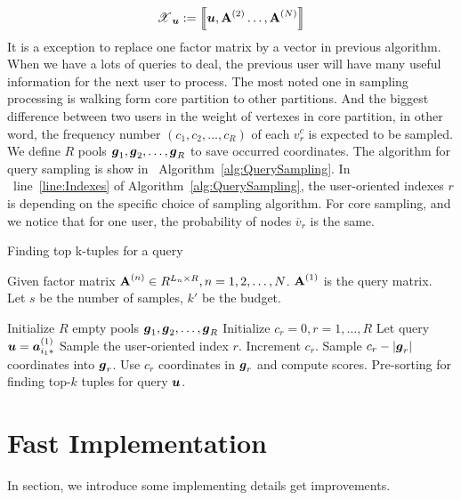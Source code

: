 \documentclass[letterpaper]{article}
\newcommand{\T}[1]{\boldsymbol{\mathscr{\MakeUppercase{#1}}}}
\newcommand{\KT}[1]{\left\llbracket #1 \right\rrbracket}
\newcommand{\V}[1]{{\bm{{\MakeLowercase{#1}}}}}
\newcommand{\VnC}[3]{\V{#1}^{(#2)}_{#3}}
\newcommand{\M}[1]{{\bm{\mathbf{\MakeUppercase{#1}}}}}
\newcommand{\Mn}[2]{\M{#1}^{(#2)}}
\newcommand{\Alg}[1] {Algorithm~\ref{alg:#1}}
\newcommand{\AlgLine}[2]{line~\ref{line:#2} of Algorithm~\ref{alg:#1}}
\begin{document}
\begin{equation}\label{eq:RankTensorCP}
\T{X}_{\V{u}} := \KT{ \V{u},\Mn{A}{2}\dots,\Mn{A}{N}}
\end{equation}
It is a exception to replace one factor matrix by a vector in previous algorithm.
When we have a lots of queries to deal,
the previous user will have many useful information for the next user to process.
The most noted one in sampling processing is walking form core partition to other partitions.
And the biggest difference between two users in the weight of vertexes in core partition,
in other word,
the frequency number $(c_1,c_2,\ldots,c_R)$ of each $v^c_r$ is expected to be sampled.
We define $R$ pools $\V{g}_1,\V{g}_2,\ldots,\V{g}_R$ to save occurred coordinates.
The algorithm for query sampling is show in ~\Alg{QuerySampling}.
In ~\AlgLine{QuerySampling}{Indexes},
the user-oriented indexes $r$ is depending on the specific choice of sampling algorithm.
For core sampling, and we notice that for one user,
the probability of nodes $\overline{v}_r$ is the same.

\begin{algorithm}[t]
    \caption{Finding top k-tuples for a query}\label{alg:QuerySampling}
        Given factor matrix $\M{A}^{(n)}\in R^{L_n\times R}, n = 1,2,\ldots,N$.
        $\M{A}^{(1)}$ is the query matrix.\\
        Let $s$ be the number of samples, $k'$ be the budget.
    \begin{algorithmic}[1]
    \State Initialize $R$ empty pools $\V{g}_1,\V{g}_2,\ldots,\V{g}_R$
    \State Initialize $c_r = 0,r= 1,\ldots,R$
    \State Let query $\V{u}=\VnC{a}{1}{i_1*}$
    \State Sample the user-oriented index $r$.
    \label{line:Indexes}
    \State  Increment $c_r$.
    \EndFor
    \If {$c_r > |\V{g}_r|$ }
    \State Sample $c_r - |\V{g}_r|$ coordinates into $\V{g}_r$.
    \EndIf
    \State Use $c_r$ coordinates in $\V{g}_r$ and compute scores.
    \EndFor
    \State Pre-sorting for finding top-$k$ tuples for query $\V{u}$.
    \EndFor
    \end{algorithmic}
\end{algorithm}

\section{Fast Implementation}
In section, we introduce some implementing details get improvements.
\end{document}
